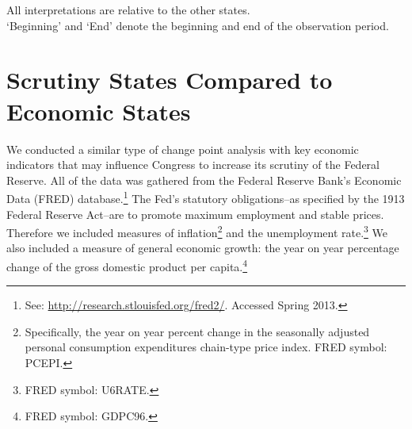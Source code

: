 \documentclass[a4paper]{article}\usepackage[]{graphicx}\usepackage[]{color}
\begin{document}
\begin{table}
    \caption{Summary of Estimated Scrutiny States}
    \label{ObservedTable}

    {\scriptsize{All interpretations are relative to the other states. \\
    `Beginning' and `End' denote the beginning and end of the observation period.}}
\end{table}

\section{Scrutiny States Compared to Economic States}

We conducted a similar type of change point analysis with key economic indicators that may influence Congress to increase its scrutiny of the Federal Reserve. All of the data was gathered from the Federal Reserve Bank's Economic Data (FRED) database.\footnote{See: \url{http://research.stlouisfed.org/fred2/}. Accessed Spring 2013.} The Fed's statutory obligations--as specified by the 1913 Federal Reserve Act--are to promote maximum employment and stable prices. Therefore we included measures of inflation\footnote{Specifically, the year on year percent change in the seasonally adjusted personal consumption expenditures chain-type price index. FRED symbol: PCEPI.} and the unemployment rate.\footnote{FRED symbol: U6RATE.} We also included a measure of general economic growth: the year on year percentage change of the gross domestic product per capita.\footnote{FRED symbol: GDPC96.}
\end{document}
